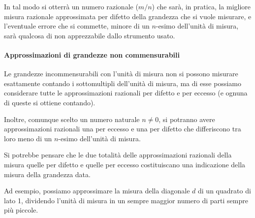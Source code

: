 In tal modo si otterrà un numero razionale (\(m/n\)) che sarà, in pratica, 
la migliore misura razionale approssimata per difetto della grandezza che si 
vuole misurare, e l'eventuale errore che si commette, minore di un 
\(n\)-esimo dell'unità di misura, sarà qualcosa di non apprezzabile dallo 
strumento usato.

\vspace{.4em}

\paragraph{Approssimazioni di grandezze non commensurabili}

Le grandezze incommensurabili con l'unità di misura non si possono misurare 
esattamente contando i sottomultipli dell'unità di misura, ma di esse 
possiamo considerare tutte le approssimazioni razionali per difetto e 
per eccesso (e ognuna di queste si ottiene contando). 

Inoltre, comunque scelto un numero naturale  \(n \neq 0\), 
si potranno avere approssimazioni razionali una per eccesso e una per difetto 
che differiscono tra loro meno di un \(n\)-esimo dell'unità di misura.

Si potrebbe pensare che le due totalità delle approssimazioni razionali 
della misura quelle per difetto e quelle per eccesso costituiscano una 
indicazione della misura della grandezza data.

Ad esempio, possiamo approssimare la misura della diagonale \(d\) di un 
quadrato di lato 1, dividendo l’unità di misura in un sempre maggior 
numero di parti sempre più piccole.

